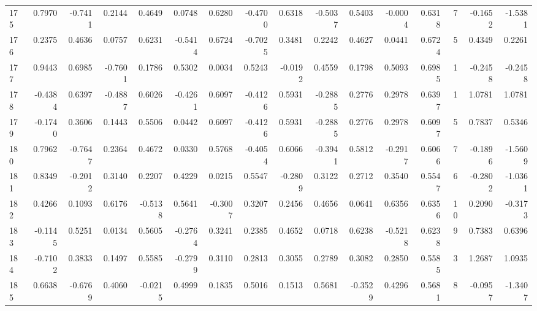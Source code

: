 \begin{tabular}{lrrrrrrrrrrrrrrr}
175 &      0.7970 & -0.7411 &  0.2144 &  0.4649 &  0.0748 &  0.6280 & -0.4700 &  0.6318 & -0.5037 &  0.5403 &  -0.0004 &     0.6318 &      7 &                   -0.1652 &                    -1.5381 \\
176 &      0.2375 &  0.4636 &  0.0757 &  0.6231 & -0.5414 &  0.6724 & -0.7025 &  0.3481 &  0.2242 &  0.4627 &   0.0441 &     0.6724 &      5 &                    0.4349 &                     0.2261 \\
177 &      0.9443 &  0.6985 & -0.7601 &  0.1786 &  0.5302 &  0.0034 &  0.5243 & -0.0192 &  0.4559 &  0.1798 &   0.5093 &     0.6985 &      1 &                   -0.2458 &                    -0.2458 \\
178 &     -0.4384 &  0.6397 & -0.4887 &  0.6026 & -0.4261 &  0.6097 & -0.4126 &  0.5931 & -0.2885 &  0.2776 &   0.2978 &     0.6397 &      1 &                    1.0781 &                     1.0781 \\
179 &     -0.1740 &  0.3606 &  0.1443 &  0.5506 &  0.0442 &  0.6097 & -0.4126 &  0.5931 & -0.2885 &  0.2776 &   0.2978 &     0.6097 &      5 &                    0.7837 &                     0.5346 \\
180 &      0.7962 & -0.7647 &  0.2364 &  0.4672 &  0.0330 &  0.5768 & -0.4054 &  0.6066 & -0.3941 &  0.5812 &  -0.2917 &     0.6066 &      7 &                   -0.1896 &                    -1.5609 \\
181 &      0.8349 & -0.2012 &  0.3140 &  0.2207 &  0.4229 &  0.0215 &  0.5547 & -0.2809 &  0.3122 &  0.2712 &   0.3540 &     0.5547 &      6 &                   -0.2802 &                    -1.0361 \\
182 &      0.4266 &  0.1093 &  0.6176 & -0.5138 &  0.5641 & -0.3007 &  0.3207 &  0.2456 &  0.4656 &  0.0641 &   0.6356 &     0.6356 &     10 &                    0.2090 &                    -0.3173 \\
183 &     -0.1145 &  0.5251 &  0.0134 &  0.5605 & -0.2764 &  0.3241 &  0.2385 &  0.4652 &  0.0718 &  0.6238 &  -0.5218 &     0.6238 &      9 &                    0.7383 &                     0.6396 \\
184 &     -0.7102 &  0.3833 &  0.1497 &  0.5585 & -0.2799 &  0.3110 &  0.2813 &  0.3055 &  0.2789 &  0.3082 &   0.2850 &     0.5585 &      3 &                    1.2687 &                     1.0935 \\
185 &      0.6638 & -0.6769 &  0.4060 & -0.0215 &  0.4999 &  0.1835 &  0.5016 &  0.1513 &  0.5681 & -0.3529 &   0.4296 &     0.5681 &      8 &                   -0.0957 &                    -1.3407 \\

\end{tabular}
